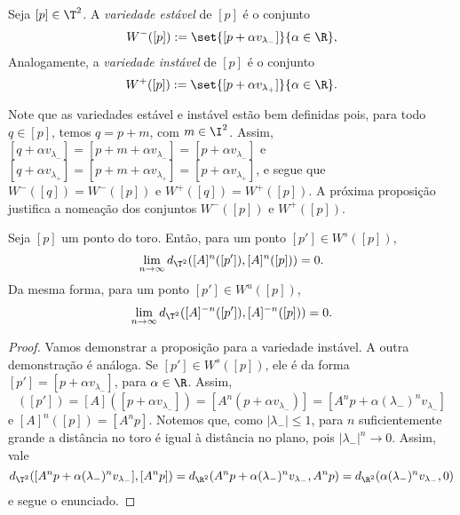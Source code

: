 \begin{definition}
Seja $[p] \in \T^2$. A \textit{variedade estável} de $[p]$ é o conjunto
	\begin{equation*}
	W^-([p]) := \set{[p + \alpha v_{\lambda_-}]}{\alpha \in \R},
	\end{equation*}
Analogamente, a \textit{variedade instável} de $[p]$ é o conjunto
	\begin{equation*}
	W^+([p]) := \set{[p + \alpha v_{\lambda_+}]}{\alpha \in \R}.
	\end{equation*}
\end{definition}

Note que as variedades estável e instável estão bem definidas pois, para todo $q \in [p]$, temos $q = p + m$, com $m \in \I^2$. Assim, $[q + \alpha v_{\lambda_-}] = [p + m + \alpha v_{\lambda_-}] = [p + \alpha v_{\lambda_-}]$ e $[q + \alpha v_{\lambda_+}] = [p + m + \alpha v_{\lambda_+}] = [p + \alpha v_{\lambda_+}]$, e segue que $W^-([q]) = W^-([p])$ e $W^+([q]) = W^+([p])$. A próxima proposição justifica a nomeação dos conjuntos $W^-([p])$ e $W^+([p])$.

\begin{theorem}
	Seja $[p]$ um ponto do toro. Então, para um ponto $[p'] \in W^s([p])$,
	\begin{equation*}
	\lim_{n \to \infty} d_{\T^2}([A]^n([p']),[A]^n([p])) = 0.
	\end{equation*}
Da mesma forma, para um ponto $[p'] \in W^u([p])$,
	\begin{equation*}
	\lim_{n \to \infty} d_{\T^2}([A]^{-n}([p']),[A]^{-n}([p])) = 0.
	\end{equation*}
\end{theorem}
\begin{proof}
	Vamos demonstrar a proposição para a variedade instável. A outra demonstração é análoga. Se $[p'] \in W^s([p])$, ele é da forma $[p'] = [p + \alpha v_{\lambda_-}]$, para $\alpha \in \R$. Assim,
	\begin{equation*}
	[A]([p']) = [A]([p + \alpha v_{\lambda_-}]) = [A^n(p + \alpha v_{\lambda_-})] = [A^np + \alpha (\lambda_-)^n v_{\lambda_-}]
	\end{equation*}
e $[A]^n([p]) = [A^np]$. Notemos que, como $|\lambda_-| \leq 1$, para $n$ suficientemente grande a distância no toro é igual à distância no plano, pois $|\lambda_-|^n \rightarrow 0$. Assim, vale
	\begin{equation*}
	d_{\T^2}([A^np + \alpha (\lambda_-)^n v_{\lambda_-}],[A^np]) = d_{\R^2}(A^np + \alpha (\lambda_-)^n v_{\lambda_-},A^np) = d_{\R^2}(\alpha (\lambda_-)^n v_{\lambda_-},0)
	\end{equation*}
e segue o enunciado.
\end{proof}

